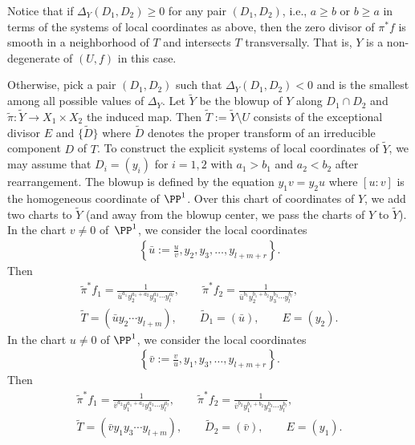 Notice that if $\Delta_Y(D_1,D_2) \geq 0$ for any pair $(D_1, D_2)$, i.e., $a\geq b$ or $b\geq a$ in terms of the systems of local coordinates as above, then the zero divisor of $\pi^*f$ is smooth in a neighborhood of $T$
and intersects $T$ transversally. That is, $Y$ is a non-degenerate {\cpt} of $(U,f)$ in this case.

Otherwise, pick a pair $(D_1,D_2)$ such that $\Delta_Y(D_1,D_2) <0$ and is the smallest among all possible values of $\Delta_Y$. Let $\widetilde{Y}$ be the blowup of $Y$ along $D_1\cap D_2$ and $\tilde{\pi}\colon \widetilde{Y} \to X_1\times X_2$ the induced map. Then $\widetilde{T}:= \widetilde{Y}\setminus U$ consists of the exceptional divisor $E$ and $\{\widetilde{D}\}$ where $\widetilde{D}$ denotes the proper transform of an irreducible component $D$ of $T$. To construct the explicit systems of local coordinates of $\widetilde{Y}$, we may assume that $D_i = (y_i)$ for $i=1,2$ with $a_1 > b_1$ and $a_2 < b_2$ after rearrangement. The blowup is defined by the equation $y_1v=y_2u$ where $[u:v]$ is the homogeneous coordinate of $\PP^1$. Over this chart of coordinates of $Y$, we add two charts to $\widetilde{Y}$ (and away from the blowup center, we pass the charts of $Y$ to $\widetilde{Y}$). In the chart $v\neq 0$ of~$\PP^1$, we consider the local coordinates
\begin{gather}\label{eq:Yv_LocCoor}
\left\{ \bar{u}:= \frac{u}{v}, y_2, y_3, \dots, y_{l+m+r} \right\}.
\end{gather}
Then
\begin{gather}\label{eq:Yv_LocBeh}
\tilde{\pi}^*f_1 = \frac{1}{\bar{u}^{a_1}y_2^{a_1+a_2}	y_3^{a_3}\cdots y_l^{a_l}},\qquad \tilde{\pi}^*f_2 = \frac{1}{\bar{u}^{b_1}y_2^{b_1+b_2}	y_3^{b_3}\cdots y_l^{b_l}},
\\\widetilde{T} = (\bar{u}y_2\cdots y_{l+m}),\qquad \widetilde{D}_1 = (\bar{u}), \qquad E = (y_2).\nonumber \end{gather}
In the chart $u\neq 0$ of $\PP^1$, we consider the local coordinates
\begin{gather}\label{eq:Yu_LocCoor}
\left\{ \bar{v}:= \frac{v}{u}, y_1, y_3, \dots, y_{l+m+r} \right\}.
\end{gather}
Then
\begin{gather}\label{eq:Yu_LocBeh}
\tilde{\pi}^*f_1 = \frac{1}{\bar{v}^{a_2}y_1^{a_1+a_2}	y_3^{a_3}\cdots y_l^{a_l}},\qquad \tilde{\pi}^*f_2 = \frac{1}{\bar{v}^{b_2}y_1^{b_1+b_2}	y_3^{b_3}\cdots y_l^{b_l}},
\\ \widetilde{T} = (\bar{v}y_1y_3\cdots y_{l+m}),\qquad \widetilde{D}_2 = (\bar{v}), \qquad E = (y_1). \nonumber\end{gather}
